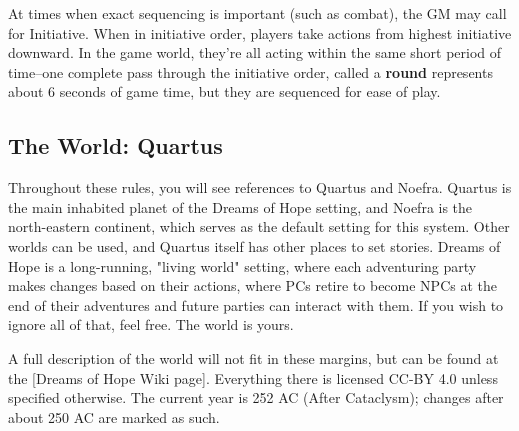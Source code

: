 At times when exact sequencing is important (such as combat), the GM may call for Initiative. When in initiative order, players take actions from highest initiative downward. In the game world, they're all acting within the same short period of time--one complete pass through the initiative order, called a \textbf{round} represents about 6 seconds of game time, but they are sequenced for ease of play.

\subsection{The World: Quartus}
Throughout these rules, you will see references to Quartus and Noefra. Quartus is the main inhabited planet of the Dreams of Hope setting, and Noefra is the north-eastern continent, which serves as the default setting for this system. Other worlds can be used, and Quartus itself has other places to set stories. Dreams of Hope is a long-running, "living world" setting, where each adventuring party makes changes based on their actions, where PCs retire to become NPCs at the end of their adventures and future parties can interact with them. If you wish to ignore all of that, feel free. The world is yours.

A full description of the world will not fit in these margins, but can be found at the \href{https://wiki.admiralbenbo.org}[Dreams of Hope Wiki page]. Everything there is licensed CC-BY 4.0 unless specified otherwise. The current year is 252 AC (After Cataclysm); changes after about 250 AC are marked as such.

